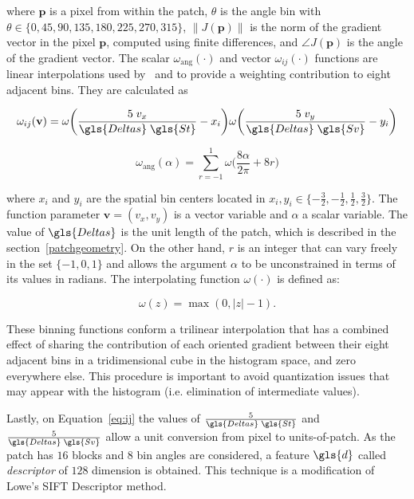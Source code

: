 \noindent  where $\mathbf{p}$ is a pixel from within the patch,  $\theta$ is the angle bin with $ \theta \in \{0, 45, 90, 135, 180, 225, 270, 315\} $,  $ \left\lVert J(\mathbf{p}) \right\rVert $ is the norm of the gradient vector in the pixel $\mathbf{p}$, computed using finite differences, and $\angle J(\mathbf{p}) $ is the angle of the gradient vector.  The scalar $ \omega_\mathrm{ang}(\cdot) $  and vector $ \omega_{ij}(\cdot) $ functions are linear interpolations used by~\cite{Lowe2004} and \cite{Vedaldi2010} to provide a weighting contribution to eight adjacent bins.  They are calculated as  

\begin{equation}
 \omega_{ij}(\mathbf{v}) = \omega \bigg ( \frac{5 \;v_x}{\gls{Deltas} \; \gls{St}} - x_i \bigg ) \omega \bigg ( \frac{5 \; v_y}{\gls{Deltas} \; \gls{Sv}} - y_i \bigg ) 
\label{eq:ij}
\end{equation}

\begin{equation}
 \omega_\mathrm{ang}(\alpha) = \sum_{r=-1}^{1} \omega \bigg ( \frac{8\alpha}{2\pi} + 8r \bigg )
\label{eq:wang}
\end{equation}

\noindent where $x_i$ and $y_i$ are the spatial bin centers located in $ x_i,y_i \in \{-\frac{3}{2},-\frac{1}{2},\frac{1}{2},\frac{3}{2}\} $. The function parameter $\mathbf{v} = ( v_x, v_y ) $ is a vector variable and $\alpha$ a scalar variable.  The value of  $\gls{Deltas}$ is the unit length of the patch, which is described in the section~\ref{patchgeometry}.  On the other hand, $r$ is an integer that can vary freely in the set $\{ -1, 0, 1 \} $ and allows the argument $\alpha$ to be unconstrained in terms of its values in radians. The interpolating function $\omega(\cdot)$ is defined as:

\begin{equation}
\omega(z) = \max(0,|z|-1).
\label{eq:weighting}
\end{equation}

These binning functions conform a trilinear interpolation that has a combined effect of sharing the contribution of each oriented gradient between their eight adjacent bins in a tridimensional cube in the histogram space, and zero everywhere else.  This procedure is important to avoid quantization issues that may appear with the histogram (i.e. elimination of intermediate values).

Lastly, on Equation~\ref{eq:ij} the values of $ \frac{5}{\gls{Deltas} \; \gls{St}} $ and $ \frac{5}{\gls{Deltas} \; \gls{Sv}} $ allow a unit conversion from pixel to units-of-patch.  As the patch has  $16$ blocks and  $8$ bin angles are considered, a feature $\gls{d}$ called \textit{descriptor} of $128$ dimension is obtained. This technique is a modification of Lowe's SIFT Descriptor method.

